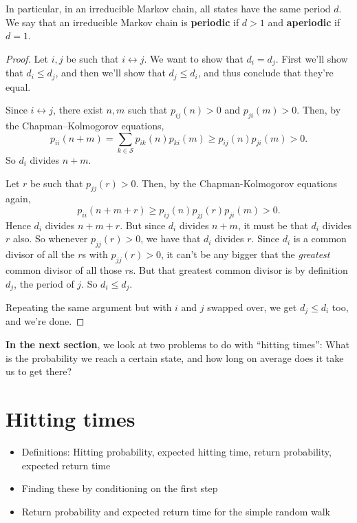 \documentclass[
  a4paper,
]{article}
\providecommand{\tightlist}{%
  \setlength{\itemsep}{0pt}\setlength{\parskip}{0pt}}
\theoremstyle{definition}
\theoremstyle{definition}
\theoremstyle{definition}
\theoremstyle{remark}
\begin{document}
In particular, in an irreducible Markov chain, all states have the same period \(d\). We say that an irreducible Markov chain is \textbf{periodic} if \(d>1\) and \textbf{aperiodic} if \(d=1\).

\begin{proof}

Let \(i,j\) be such that \(i \leftrightarrow j\). We want to show that \(d_i = d_j\). First we'll show that \(d_i \leq d_j\), and then we'll show that \(d_j \leq d_i\), and thus conclude that they're equal.

Since \(i\leftrightarrow j\), there exist \(n,m\) such that \(p_{ij}(n)>0\) and \(p_{ji}(m)>0\). Then, by the Chapman--Kolmogorov equations,
\[ p_{ii}(n+m) =  \sum_{k \in \mathcal S} p_{ik}(n) p_{ki}(m) \geq p_{ij}(n) p_{ji}(m) > 0 .  \]
So \(d_i\) divides \(n+m\).

Let \(r\) be such that \(p_{jj}(r)>0\). Then, by the Chapman-Kolmogorov equations again,
\[
    p_{ii}(n+m+r)\geq  p_{ij}(n) p_{jj}(r) p_{ji}(m) > 0.
    \]
Hence \(d_i\) divides \(n+m+r\). But since \(d_i\) divides \(n+m\), it must be that \(d_i\) divides \(r\) also. So whenever \(p_{jj}(r)>0\), we have that \(d_i\) divides \(r\). Since \(d_i\) is a common divisor of all the \(r\)s with \(p_{jj}(r)>0\), it can't be any bigger that the \emph{greatest} common divisor of all those \(r\)s. But that greatest common divisor is by definition \(d_j\), the period of \(j\). So \(d_i \leq d_j\).

Repeating the same argument but with \(i\) and \(j\) swapped over, we get \(d_j\leq d_i\) too, and we're done.

\end{proof}

\textbf{In the next section}, we look at two problems to do with ``hitting times'': What is the probability we reach a certain state, and how long on average does it take us to get there?

\hypertarget{S08-hitting-times}{%
\section{Hitting times}\label{S08-hitting-times}}

\begin{itemize}
\tightlist
\item
  Definitions: Hitting probability, expected hitting time, return probability, expected return time
\item
  Finding these by conditioning on the first step
\item
  Return probability and expected return time for the simple random walk
\end{itemize}
\end{document}
